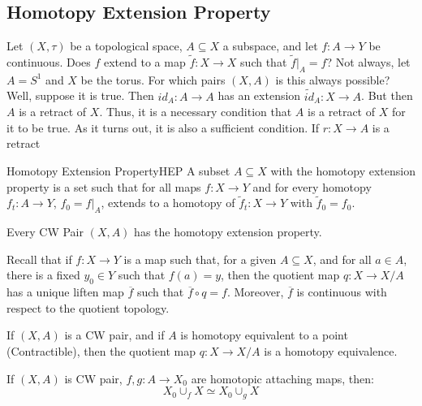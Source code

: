 \documentclass{book}                                                           %
\begin{document}
    \subsection{Homotopy Extension Property}
        Let $(X,\tau)$ be a topological space,
        $A\subseteq{X}$ a subspace, and let
        $f:A\rightarrow{Y}$ be continuous. Does
        $f$ extend to a map $\tilde{f}:X\rightarrow{X}$
        such that $\tilde{f}|_{A}=f$? Not always, let
        $A=S^{1}$ and $X$ be the torus. For which pairs
        $(X,A)$ is this always possible? Well, suppose
        it is true. Then $id_{A}:A\rightarrow{A}$ has
        an extension $\tilde{id}_{A}:X\rightarrow{A}$.
        But then $A$ is a retract of $X$. Thus, it
        is a necessary condition that $A$ is a retract
        of $X$ for it to be true. As it turns out, it is
        also a sufficient condition. If
        $r:X\rightarrow{A}$ is a retract
        \begin{ldefinition}{Homotopy Extension Property}{HEP}
            A subset $A\subseteq{X}$ with the homotopy
            extension property is a set such that for all
            maps $f:X\rightarrow{Y}$ and for every
            homotopy $f_{t}:A\rightarrow{Y}$,
            $f_{0}=f|_{A}$, extends to a homotopy of
            $\tilde{f}_{t}:X\rightarrow{Y}$ with
            $\tilde{f}_{0}=f_{0}$.
        \end{ldefinition}
        \begin{theorem}
            Every CW Pair $(X,A)$ has the homotopy
            extension property.
        \end{theorem}
        Recall that if $f:X\rightarrow{Y}$ is a map such that,
        for a given $A\subseteq{X}$, and for all $a\in{A}$,
        there is a fixed $y_{0}\in{Y}$ such that $f(a)=y$, then
        the quotient map $q:X\rightarrow{X/A}$ has a unique
        liften map $\overline{f}$ such that
        $\overline{f}\circ{q}=f$. Moreover, $\overline{f}$ is
        continuous with respect to the quotient topology.
        \begin{theorem}
            If $(X,A)$ is a CW pair, and if $A$ is
            homotopy equivalent to a point
            (Contractible), then the quotient map
            $q:X\rightarrow{X/A}$ is a homotopy
            equivalence.
        \end{theorem}
        \begin{theorem}
            If $(X,A)$ is CW pair, $f,g:A\rightarrow{X_{0}}$
            are homotopic attaching maps, then:
            \begin{equation}
                X_{0}\cup_{f}X\simeq{X}_{0}\cup_{g}X
            \end{equation}
        \end{theorem}
\end{document}
